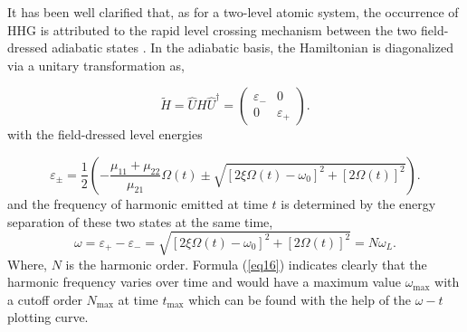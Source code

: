\documentclass[10pt,letterpaper]{article}
\begin{document}
It has been well clarified that, as for a two-level atomic system, the occurrence of HHG is attributed to the rapid level crossing mechanism between the two field-dressed adiabatic states  \cite{Gauthey-Early-Two-Level-PRA-1997}. In the adiabatic basis, the Hamiltonian is diagonalized via a unitary transformation as,

\begin{equation}
\tilde H = \hat UH{\hat U^\dag } = \left( {\begin{array}{*{20}{c}}
	{{\varepsilon _ - }}&0\\
	0&{{\varepsilon _ + }}
	\end{array}} \right).
\label{eq14}
\end{equation}
with the field-dressed level energies \cite{YangWeifeng-Two-Level-PLA-2007}

\begin{equation}
{\varepsilon _ \pm } = \frac{1}{2}\left( { - \frac{{{\mu _{11}} + {\mu _{22}}}}{{{\mu _{21}}}}\Omega \left( t \right) \pm \sqrt {{{\left[ {2\xi \Omega \left( t \right) - {\omega _0}} \right]}^2} + {{\left[ {2\Omega \left( t \right)} \right]}^2}} } \right).
\label{eq15}
\end{equation}
and the frequency of harmonic emitted at time $t$ is determined by the energy separation of these two states at the same time,
\begin{equation}
\omega  = {\varepsilon _ + } - {\varepsilon _ - } = \sqrt {{{\left[ {2\xi \Omega \left( t \right) - {\omega _0}} \right]}^2} + {{\left[ {2\Omega \left( t \right)} \right]}^2}}  = N{\omega _L}.
\label{eq16}
\end{equation}
Where, $N$ is the harmonic order. Formula (\ref{eq16}) indicates clearly that the harmonic frequency varies over time and would have a maximum value $\omega_{\textrm{max}}$ with a cutoff order $N_{\textrm{max}}$ at time $t_{\textrm{max}}$ which can be found with the help of the $\omega-t$ plotting curve.
\end{document}
